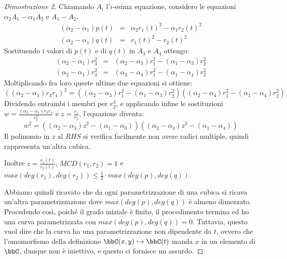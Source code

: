 \begin{proof}[Dimostrazione 2]
Chiamando $A_i$ l'$i$-esima equazione, considero le equazioni $\alpha_2A_1-\alpha_1A_2$ e $A_1-A_2$.
\begin{eqnarray*}
  (\alpha_2-\alpha_1)p(t) &=& \alpha_2r_1(t)^2-\alpha_1r_2(t)^2 \\
  (\alpha_2-\alpha_1)q(t) &=& r_1(t)^2-r_2(t)^2
\end{eqnarray*}
Sostituendo i valori di $p(t)$ e di $q(t)$ in $A_3$ e $A_4$ ottengo:
\begin{eqnarray*}
  (\alpha_2-\alpha_1)r_3^2 &=& (\alpha_2-\alpha_3)r_1^2-(\alpha_1-\alpha_3)r_2^2 \\
  (\alpha_2-\alpha_1)r_4^2 &=& (\alpha_2-\alpha_4)r_1^2-(\alpha_1-\alpha_4)r_2^2
\end{eqnarray*}
Moltiplicando fra loro queste ultime due equazioni si ottiene:
\begin{equation*}
  ((\alpha_2-\alpha_1)r_3r_4)^2 = ((\alpha_2-\alpha_3)r_1^2-(\alpha_1-\alpha_3)r_2^2)((\alpha_2-\alpha_4)r_1^2-(\alpha_1-\alpha_4)r_2^2)
\end{equation*}
Dividendo entrambi i membri per $r_2^4$, e applicando infine le sostituzioni $w=\frac{(\alpha_2-\alpha_1)r_3r_4}{r_2^2}$ e $z=\frac{r_1}{r_2}$, l'equazione diventa:
$$w^2=((\alpha_2-\alpha_3)z^2-(\alpha_1-\alpha_3))((\alpha_2-\alpha_4)z^2-(\alpha_1-\alpha_4))$$
Il polinomio in $z$ al $RHS$ si verifica facilmente non avere radici multiple, quindi rappresenta un'altra cubica.

Inoltre $z=\frac{r_1(t)}{r_2(t)}$, $MCD(r_1,r_2)=1$ e $max(deg(r_1), deg(r_2))\leq\frac{1}{2}\cdot max(deg(p),deg(q))$.

Abbiamo quindi ricavato che da ogni parametrizzazione di una cubica si ricava un'altra parametrizzazione dove $max(deg(p),deg(q))$ è almeno dimezzato.
Procedendo così, poiché il grado iniziale è finito, il procedimento termina ed ho una curva parametrizzata con $max(deg(p),deg(q))=0$.
Tuttavia, questo vuol dire che la curva ha una parametrizzazione non dipendente da $t$, ovvero che l'omomorfismo della definizione $\bbC(x,y)\hookrightarrow\bbC(t)$ manda $x$ in un elemento di $\bbC$, dunque non è iniettivo, e questo ci fornisce un assurdo.
\end{proof}
